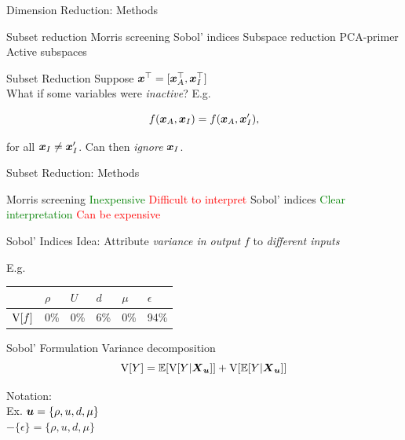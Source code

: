 \documentclass[14pt]{beamer}
\begin{document}
\begin{frame}{Dimension Reduction: Methods}
  \begin{outline}
    \1 Subset reduction
      \2 Morris screening
      \2 Sobol' indices
    \1 Subspace reduction
      \2 PCA-primer
      \2 Active subspaces
  \end{outline}
\end{frame}

\begin{frame}{Subset Reduction}
  Suppose $\boldsymbol{x}^{\top} = [\boldsymbol{x}_A^{\top}, \boldsymbol{x}_I^{\top}]$ \\
  What if some variables were \emph{inactive}? E.g.

  \begin{equation*}
    f(\boldsymbol{x}_A, \boldsymbol{x}_I) = f(\boldsymbol{x}_A, \boldsymbol{x}'_I),
  \end{equation*}

  \noindent for all $\boldsymbol{x}_I \neq \boldsymbol{x}'_I$. Can then \emph{ignore} $\boldsymbol{x}_I$.
\end{frame}

\begin{frame}{Subset Reduction: Methods}
  \begin{outline}
    \1 Morris screening
      \2 \textcolor{green}{Inexpensive}
      \2 \textcolor{red}{Difficult to interpret}
    \1 Sobol' indices
      \2 \textcolor{green}{Clear interpretation}
      \2 \textcolor{red}{Can be expensive}
  \end{outline}
\end{frame}

\begin{frame}{Sobol' Indices}
  Idea: Attribute \emph{variance in output} $f$ to \emph{different inputs}

  \bigskip E.g.
  \begin{table}
    \centering
    \begin{tabular}{@{}llllll@{}}
     & $\rho$ & $U$ & $d$ & $\mu$ & $\epsilon$\\
    \hline
    $\mathrm{V}[f]$ & 0\% & 0\% & 6\% & 0\% & 94\% \\
    \end{tabular}
  \end{table}

\end{frame}

\begin{frame}{Sobol' Formulation}
  Variance decomposition
  \begin{equation*}
    \mathrm{V}[Y] = \mathbb{E}[\mathrm{V}[Y|\boldsymbol{X}_{\boldsymbol{u}}]] + \mathrm{V}[\mathbb{E}[Y|\boldsymbol{X}_{\boldsymbol{u}}]]
  \end{equation*}

  Notation: \\
  Ex. $\boldsymbol{u} = \{\rho,u,d,\mu\}$ \\
  $-\{\epsilon\} = \{\rho,u,d,\mu\}$
\end{frame}
\end{document}
